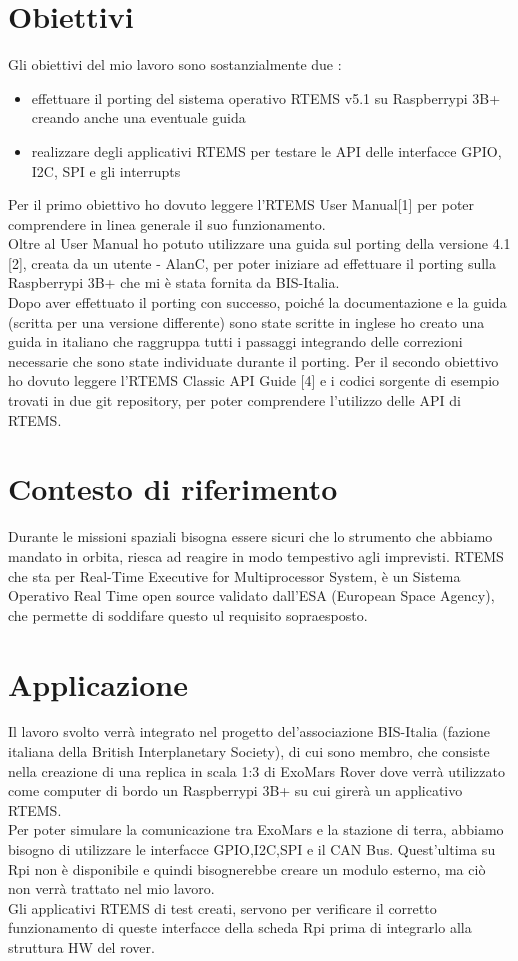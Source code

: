 \documentclass[a4paper,12pt,titlepage,oneside]{book}
\begin{document}
\section*{Obiettivi}
Gli obiettivi del mio lavoro sono sostanzialmente due :
\begin{itemize}
\item effettuare il porting del sistema operativo RTEMS v5.1 su Raspberrypi 3B+ creando anche una eventuale guida
\item realizzare degli applicativi RTEMS per testare le API delle interfacce GPIO, I2C, SPI e gli interrupts
\end{itemize}
Per il primo obiettivo ho dovuto leggere l'RTEMS User Manual[1] per poter comprendere in linea generale il suo funzionamento.\\
Oltre al User Manual ho potuto utilizzare una guida sul porting della versione 4.1 [2],  creata da un utente - AlanC, per  poter iniziare ad effettuare il porting sulla Raspberrypi 3B+ che mi è stata fornita da BIS-Italia.\\
Dopo aver effettuato il porting con successo, poiché la documentazione e la guida (scritta per una versione differente) sono state scritte in inglese ho creato una guida in italiano che raggruppa tutti i passaggi integrando delle correzioni necessarie che sono state individuate durante il porting.
Per il secondo obiettivo ho dovuto leggere l'RTEMS Classic API Guide [4] e i codici sorgente di esempio trovati in due git repository, per poter comprendere l'utilizzo delle API di RTEMS.

\section*{Contesto di riferimento}
Durante le missioni spaziali bisogna essere sicuri che lo strumento che abbiamo mandato in orbita, riesca ad reagire in modo tempestivo agli imprevisti.
RTEMS che sta per Real-Time Executive for Multiprocessor System, è un Sistema Operativo Real Time open source validato dall'ESA (European Space Agency), che permette di soddifare questo ul requisito sopraesposto.
\section*{Applicazione}
Il lavoro svolto verrà integrato nel progetto del'associazione BIS-Italia (fazione italiana della British Interplanetary Society), di cui sono membro,  che consiste nella creazione di una replica in scala 1:3 di ExoMars Rover dove verrà utilizzato come computer di bordo un Raspberrypi 3B+ su cui girerà un applicativo RTEMS.\\
Per poter simulare la comunicazione tra ExoMars e la stazione di terra, abbiamo bisogno di utilizzare le interfacce GPIO,I2C,SPI e il CAN Bus. Quest'ultima su Rpi non è disponibile e quindi bisognerebbe creare un modulo esterno, ma ciò non verrà trattato nel mio lavoro.\\
Gli applicativi RTEMS di test creati, servono per verificare il corretto funzionamento di queste interfacce della scheda Rpi prima di integrarlo alla struttura HW del rover.
\end{document}
